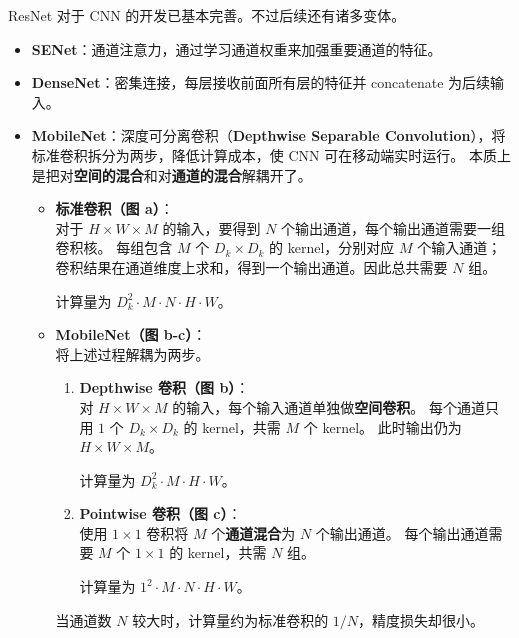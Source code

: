ResNet 对于 CNN 的开发已基本完善。不过后续还有诸多变体。

\begin{itemize}
\item
  \textbf{SENet}：通道注意力，通过学习通道权重来加强重要通道的特征。
\item
  \textbf{DenseNet}：密集连接，每层接收前面所有层的特征并 concatenate
  为后续输入。
\item
  \textbf{MobileNet}：深度可分离卷积（\textbf{Depthwise Separable
  Convolution}），将标准卷积拆分为两步，降低计算成本，使 CNN
  可在移动端实时运行。
  本质上是把对\textbf{空间的混合}和对\textbf{通道的混合}解耦开了。

  \begin{itemize}
  \item
    \textbf{标准卷积（图 a）}：\\
    对于 \(H \times W \times M\) 的输入，要得到 \(N\)
    个输出通道，每个输出通道需要一组卷积核。 每组包含 \(M\) 个
    \(D_k \times D_k\) 的 kernel，分别对应 \(M\)
    个输入通道；卷积结果在通道维度上求和，得到一个输出通道。因此总共需要
    \(N\) 组。

    计算量为 \(D_k^2 \cdot M \cdot N \cdot H \cdot W\)。
  \item
    \textbf{MobileNet（图 b-c）}：\\
    将上述过程解耦为两步。

    \begin{enumerate}
    \def\labelenumi{\arabic{enumi}.}
    \item
      \textbf{Depthwise 卷积（图 b）}：\\
      对 \(H \times W \times M\)
      的输入，每个输入通道单独做\textbf{空间卷积}。 每个通道只用 \(1\)
      个 \(D_k \times D_k\) 的 kernel，共需 \(M\) 个 kernel。
      此时输出仍为 \(H \times W \times M\)。

      计算量为 \(D_k^2 \cdot M \cdot H \cdot W\)。
    \item
      \textbf{Pointwise 卷积（图 c）}：\\
      使用 \(1 \times 1\) 卷积将 \(M\) 个\textbf{通道混合}为 \(N\)
      个输出通道。 每个输出通道需要 \(M\) 个 \(1 \times 1\) 的
      kernel，共需 \(N\) 组。

      计算量为 \(1^2 \cdot M \cdot N \cdot H \cdot W\)。
    \end{enumerate}

    当通道数 \(N\) 较大时，计算量约为标准卷积的
    \(1/N\)，精度损失却很小。
  \end{itemize}
\end{itemize}

